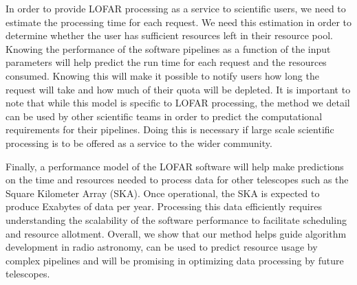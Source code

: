 In order to provide LOFAR processing as a service to scientific users, we need to estimate the processing time for each request. We need this estimation in order to determine whether the user has sufficient resources left in their resource pool. Knowing the performance of the software pipelines as a function of the input parameters will help predict the run time for each request and the resources consumed. Knowing this will make it possible to notify users how long the request will take and how much of their quota will be depleted. It is important to note that while this model is specific to LOFAR processing, the method we detail can be used by other scientific teams in order to predict the computational requirements for their pipelines. Doing this is necessary if large scale scientific processing is to be offered as a service to the wider community.

Finally, a performance model of the LOFAR software will help make predictions on the time and resources needed to process data for other telescopes such as the Square Kilometer Array (SKA). Once operational, the SKA is expected to produce Exabytes of data per year. Processing this data efficiently requires understanding the scalability of the software performance to facilitate scheduling and resource allotment. Overall, we show that our method helps guide algorithm development in radio astronomy, can be used to predict resource usage by complex pipelines and will be promising in optimizing data processing by future telescopes. 
